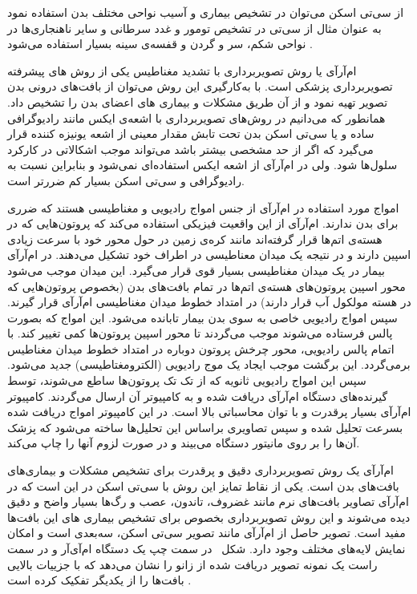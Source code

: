 از سی‌تی اسکن می‌توان در تشخیص بیماری و آسیب نواحی مختلف بدن استفاده نمود به عنوان مثال از سی‌تی در تشخیص تومور و غدد سرطانی و سایر ناهنجاری‌ها در نواحی شکم، سر و گردن و قفسه‌ی سینه بسیار استفاده می‌شود .  


ام‌آرآی یا روش تصویربرداری با تشدید مغناطیس یکی از روش های پیشرفته تصویربرداری پزشکی است. با به‌کارگیری این روش می‌توان از بافت‌های درونی بدن تصویر تهیه نمود و از آن طریق مشکلات و بیماری های اعضای بدن را تشخیص داد.
همانطور که می‌دانیم در روش‌های تصویربرداری با اشعه‌ی ایکس مانند رادیوگرافی ساده و یا سی‌تی اسکن بدن تحت تابش مقدار معینی از اشعه یونیزه کننده قرار می‌گیرد که اگر از حد مشخصی بیشتر باشد می‌تواند موجب اشکالاتی در کارکرد سلول‌ها شود. ولی در ام‌آرآی از اشعه ایکس استفاده‌ای نمی‌شود و بنابراین نسبت به رادیوگرافی و سی‌تی اسکن بسیار کم ضررتر است.

امواج مورد استفاده در ام‌آرآی از جنس امواج رادیویی و مغناطیسی هستند که ضرری برای بدن ندارند. ام‌آرآی از این واقعیت فیزیکی استفاده می‌کند که پروتون‌هایی که در هسته‌ی اتم‌ها قرار گرفته‌اند مانند کره‌ی زمین در حول محور خود با سرعت زیادی اسپین دارند و در نتیجه یک میدان معناطیسی در اطراف خود تشکیل می‌دهند. در ام‌آرآی بیمار در یک میدان مغناطیسی بسیار قوی قرار می‌گیرد. این میدان موجب می‌شود محور اسپین پروتون‌های هسته‌ی اتم‌ها در تمام بافت‌های بدن (بخصوص پروتون‌هایی که در هسته مولکول آب قرار دارند) در امتداد خطوط میدان مغناطیسی ام‌آرآی قرار گیرند. سپس امواج رادیویی خاصی به سوی بدن بیمار تابانده می‌شود. این امواج که بصورت پالس فرستاده می‌شوند موجب می‌گردند تا محور اسپین پروتون‌ها کمی تغییر کند. با اتمام پالس رادیویی، محور چرخش پروتون دوباره در امتداد خطوط میدان مغناطیس برمی‌گردد. این برگشت موجب ایجاد یک موج رادیویی (الکترومغتاطیسی) جدید می‌شود. سپس این امواج رادیویی ثانویه که از تک تک پروتون‌ها ساطع می‌شوند، توسط گیرنده‌های دستگاه ام‌آرآی دریافت شده و به کامپیوتر آن ارسال می‌گردند. کامپیوتر ام‌آرآی بسیار پرقدرت و با توان محاسباتی بالا است. در این کامپیوتر امواج دریافت شده بسرعت تحلیل شده و سپس تصاویری براساس این تحلیل‌ها ساخته می‌شود که پزشک آن‌ها را بر روی مانیتور دستگاه می‌بیند و در صورت لزوم آنها را چاپ می‌کند.


ام‌آرآی یک روش تصویربرداری دقیق و پرقدرت برای تشخیص مشکلات و بیماری‌های بافت‌های بدن است. یکی از نقاط تمایز این روش با سی‌تی اسکن در این است که در ام‌آرآی تصاویر بافت‌های نرم مانند غضروف، تاندون، عصب و رگ‌ها بسیار واضح و دقیق دیده می‌شوند و این روش تصویربرداری بخصوص برای تشخیص بیماری های این بافت‌ها مفید است. تصویر حاصل از ام‌آر‌آی مانند تصویر سی‌تی اسکن، سه‌بعدی است و امکان نمایش لایه‌های مختلف وجود دارد. شکل~ در سمت چپ یک دستگاه ام‌آی‌آر و در سمت راست یک نمونه تصویر دریافت شده از زانو را نشان می‌دهد که با جزییات بالایی بافت‌ها را از یکدیگر تفکیک کرده است . 

